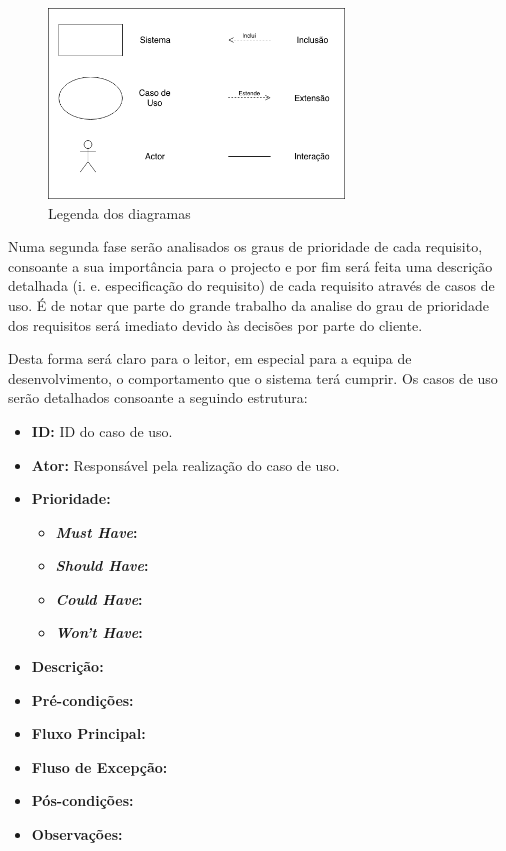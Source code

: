 \begin{figure}[ht!]
	\begin{center}
		\includegraphics[width=0.7\textwidth]{img/rf/legenda}
		\caption{Legenda dos diagramas}
		\label{fig:rf-legenda}
	\end{center}
\end{figure}

Numa segunda fase serão analisados os graus de prioridade de cada requisito, consoante a sua importância para o projecto e por fim será feita uma descrição detalhada (i. e. especificação do requisito) de cada requisito através de casos de uso. É de notar que parte do grande trabalho da analise do grau de prioridade dos requisitos será imediato devido às decisões por parte do cliente.

Desta forma será claro para o leitor, em especial para a equipa de desenvolvimento, o comportamento que o sistema terá cumprir. Os casos de uso serão detalhados consoante a seguindo estrutura:

\begin{itemize}
	\item \textbf{ID:} ID do caso de uso.
	\item \textbf{Ator:} Responsável pela realização do caso de uso.
	\item \textbf{Prioridade:} 
	\begin{itemize}
		\item \textbf{\textit{Must Have}:} 
		\item \textbf{\textit{Should Have}:}
		\item \textbf{\textit{Could Have}:}
		\item \textbf{\textit{Won't Have}:}
	\end{itemize}
	\item \textbf{Descrição:}
	\item \textbf{Pré-condições:}
	\item \textbf{Fluxo Principal:}
	\item \textbf{Fluso de Excepção:}
	\item \textbf{Pós-condições:}
	\item \textbf{Observações:}
\end{itemize}

